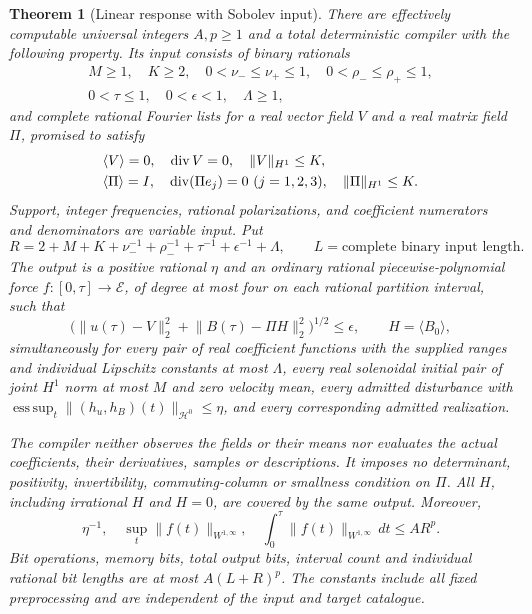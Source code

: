\documentclass[11pt,a4paper]{amsart}
\newtheorem{theorem}{Theorem}[section]
\theoremstyle{definition}
\theoremstyle{remark}
\numberwithin{equation}{section}
\newcommand{\Hcal}{\mathcal H}
\newcommand{\Ecal}{\mathcal E}
\newcommand{\norm}[1]{\lVert #1\rVert}
\newcommand{\mean}[1]{\langle #1\rangle}
\newcommand{\diver}{\operatorname{div}}
\newcommand{\esssup}{\operatorname*{ess\,sup}}
\begin{document}
\begin{theorem}[Linear response with Sobolev input]\label{thm:linear}
There are effectively computable universal integers $A,p\ge1$ and a total
deterministic compiler with the following property. Its input consists of
binary rationals
\[
 \begin{gathered}
 M\ge1,\quad K\ge2,\quad
 0<\nu_-\le\nu_+\le1,\quad 0<\rho_-\le\rho_+\le1,\\
 0<\tau\le1,\quad0<\epsilon<1,\quad\Lambda\ge1,
 \end{gathered}
\]
and complete rational Fourier lists for a real vector field $V$ and a real
matrix field $\Pi$, promised to satisfy
\begin{align}\label{eq:target}
 &\mean V=0,\quad\diver V=0,\quad\norm V_{H^1}\le K,\notag\\
 &\mean\Pi=I,\quad\diver(\Pi e_j)=0\ (j=1,2,3),
       \quad\norm\Pi_{H^1}\le K.
\end{align}
Support, integer frequencies, rational polarizations, and coefficient
numerators and denominators are variable input. Put
\begin{equation}\label{eq:R}
 R=2+M+K+\nu_-^{-1}+\rho_-^{-1}+\tau^{-1}+\epsilon^{-1}+\Lambda,
 \qquad L=\text{complete binary input length}.
\end{equation}
The output is a positive rational $\eta$ and an ordinary rational
piecewise-polynomial force $f:[0,\tau]\to\Ecal$, of degree at most four on
each rational partition interval, such that
\begin{equation}\label{eq:endpoint}
 \bigl(\norm{u(\tau)-V}_2^2+
       \norm{B(\tau)-\Pi H}_2^2\bigr)^{1/2}\le\epsilon,
 \qquad H=\mean{B_0},
\end{equation}
simultaneously for every pair of real coefficient functions with the supplied
ranges and individual Lipschitz constants at most $\Lambda$, every real
solenoidal initial pair of joint $H^1$ norm at most $M$ and zero velocity mean,
every admitted disturbance with
$\esssup_t\norm{(h_u,h_B)(t)}_{\Hcal^0}\le\eta$, and every corresponding admitted
realization.

The compiler neither observes the fields or their means nor evaluates the
actual coefficients, their derivatives, samples or descriptions. It imposes
no determinant, positivity, invertibility, commuting-column or smallness
condition on $\Pi$. All $H$, including irrational $H$ and $H=0$, are covered
by the same output. Moreover,
\begin{equation}\label{eq:physicalcost}
 \eta^{-1},\quad\sup_t\norm{f(t)}_{W^{1,\infty}},\quad
 \int_0^\tau\norm{f(t)}_{W^{1,\infty}}\,dt\le AR^p.
\end{equation}
Bit operations, memory bits, total output bits, interval count and individual
rational bit lengths are at most $A(L+R)^p$. The constants include all fixed
preprocessing and are independent of the input and target catalogue.
\end{theorem}
\end{document}

